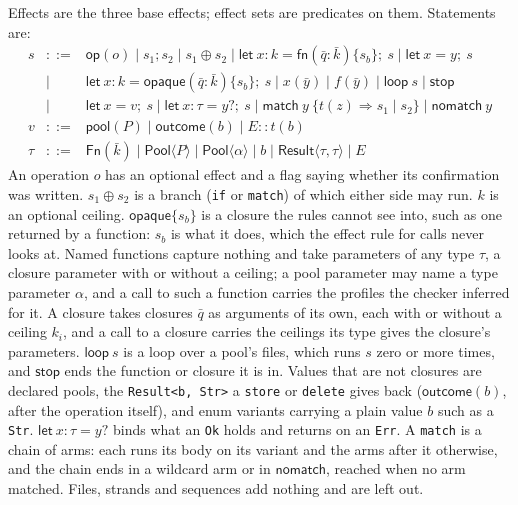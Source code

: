 \documentclass[11pt,a4paper]{article}
\newcommand{\nsl}[1]{\texttt{#1}}
\begin{document}
Effects are the three base effects; effect sets are predicates on them.
Statements are:
\[
\begin{array}{rcl}
s & ::= & \mathsf{op}(o) \mid s_1; s_2 \mid s_1 \oplus s_2
  \mid \mathsf{let}\ x{:}k = \mathsf{fn}(\bar{q}{:}\bar{k})\{s_b\};\ s
  \mid \mathsf{let}\ x = y;\ s \\
  & \mid & \mathsf{let}\ x{:}k = \mathsf{opaque}(\bar{q}{:}\bar{k})\{s_b\};\ s
  \mid x(\bar{y}) \mid f(\bar{y}) \mid \mathsf{loop}\ s \mid \mathsf{stop} \\
  & \mid & \mathsf{let}\ x = v;\ s \mid \mathsf{let}\ x{:}\tau = y?;\ s
  \mid \mathsf{match}\ y\ \{t(z) \Rightarrow s_1 \mid s_2\}
  \mid \mathsf{nomatch}\ y \\
v & ::= & \mathsf{pool}(P) \mid \mathsf{outcome}(b) \mid E{::}t(b) \\
\tau & ::= & \mathsf{Fn}(\bar{k}) \mid \mathsf{Pool}\langle P\rangle
  \mid \mathsf{Pool}\langle\alpha\rangle \mid b
  \mid \mathsf{Result}\langle\tau, \tau\rangle \mid E
\end{array}
\]
An operation $o$ has an optional effect and a flag saying whether its
confirmation was written. $s_1 \oplus s_2$ is a branch (\nsl{if} or
\nsl{match}) of which either side may run. $k$ is an optional ceiling.
$\mathsf{opaque}\{s_b\}$ is a closure the rules cannot see into, such as
one returned by a function: $s_b$ is what it does, which the effect rule
for calls never looks at. Named functions capture nothing and take
parameters of any type $\tau$, a closure parameter with or without a
ceiling; a pool parameter may name a type parameter $\alpha$, and a call
to such a function carries the profiles the checker inferred for it. A
closure takes closures $\bar{q}$ as arguments of its own, each with or
without a ceiling $k_i$, and a call to a closure carries the ceilings its
type gives the closure's parameters. $\mathsf{loop}\ s$ is a loop over a
pool's files, which runs $s$ zero or more times, and $\mathsf{stop}$ ends
the function or closure it is in. Values that are not closures are
declared pools, the \nsl{Result<b, Str>} a \nsl{store} or \nsl{delete}
gives back ($\mathsf{outcome}(b)$, after the operation itself), and enum
variants carrying a plain value $b$ such as a \nsl{Str}.
$\mathsf{let}\ x{:}\tau = y?$ binds what an \nsl{Ok} holds and returns on
an \nsl{Err}. A \nsl{match} is a chain of arms: each runs its body on its
variant and the arms after it otherwise, and the chain ends in a wildcard
arm or in $\mathsf{nomatch}$, reached when no arm matched. Files,
strands and sequences add nothing and are left out.
\end{document}
